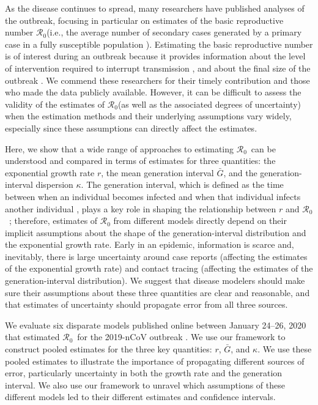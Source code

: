 \documentclass[12pt]{article}
\newcommand{\Rx}[1]{\ensuremath{{\mathcal R}_{#1}}}
\newcommand{\Ro}{\Rx{0}\xspace}
\begin{document}
As the disease continues to spread, many researchers have published analyses of the outbreak, focusing in particular on estimates of the basic reproductive number \Ro (i.e., the average number of secondary cases generated by a primary case in a fully susceptible population \citep{anderson1991infectious, diekmann1990definition}).
Estimating the basic reproductive number is of interest during an outbreak because it provides information about the level of intervention required to interrupt transmission \citep{anderson1991infectious}, and about the final size of the outbreak \citep{anderson1991infectious, ma2006generality}.
We commend these researchers for their timely contribution and those who made the data publicly available.
However, it can be difficult to assess the validity of the estimates of \Ro (as well as the associated degrees of uncertainty) when the estimation methods and their underlying assumptions vary widely, especially since these assumptions can directly affect the estimates.

Here, we show that a wide range of approaches to estimating \Ro\ can be understood and compared in terms of estimates for three quantities: the exponential growth rate $r$, the mean generation interval $\bar G$, and the generation-interval dispersion $\kappa$.
The generation interval, which is defined as the time between when an individual becomes infected and when that individual infects another individual \citep{svensson2007note}, plays a key role in shaping the relationship between $r$ and \Ro\ \citep{wearing2005appropriate, roberts2007model, wallinga2007generation, park2019practical};
therefore, estimates of $\mathcal R_0$ from different models directly depend on their implicit assumptions about the shape of the generation-interval distribution and the exponential growth rate.
Early in an epidemic, information is scarce and, inevitably, there is large uncertainty around case reports (affecting the estimates of the exponential growth rate) and contact tracing (affecting the estimates of the generation-interval distribution).
We suggest that disease modelers should make sure their assumptions about these three quantities are clear and reasonable, and that estimates of uncertainty should propagate error from all three sources.

We evaluate six disparate models published online between January 24--26, 2020 that estimated \Ro\ for the 2019-nCoV outbreak \citep{imaincov, liuncov, majumderncov, readncov, riouncov, zhaoncov}. 
We use our framework to construct pooled estimates for the three key quantities: $r$, $\bar G$, and $\kappa$. 
We use these pooled estimates to illustrate the importance of propagating different sources of error, particularly uncertainty in both the growth rate and the generation interval. 
We also use our framework to unravel which assumptions of these different models led to their different estimates and confidence intervals.
\end{document}
